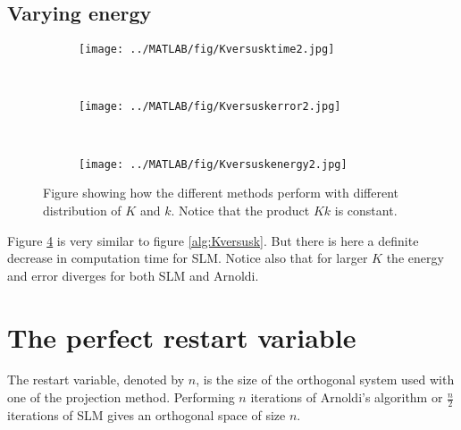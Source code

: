 \subsection{Varying energy}%
\begin{figure}[H]
        \centering
        \begin{subfigure}[b]{0.3\textwidth}
                \texttt{[image: ../MATLAB/fig/Kversusktime2.jpg]}
                \caption{  }
                \label{fig:Kversusktime2}
        \end{subfigure}
        ~
        \begin{subfigure}[b]{0.3\textwidth}
                \texttt{[image: ../MATLAB/fig/Kversuskerror2.jpg]}
                \caption{  }
                \label{fig:Kversuskerror2}
        \end{subfigure}
        ~
        \begin{subfigure}[b]{0.3\textwidth}
                \texttt{[image: ../MATLAB/fig/Kversuskenergy2.jpg]}
                \caption{  }
                \label{fig:Kversuskenergy2}
        \end{subfigure}
        \caption{Figure showing how the different methods perform with different distribution of $K$ and $k$. Notice that the product $Kk$ is constant. }
        \label{fig:Kversusk2}
\end{figure}
Figure \ref{fig:Kversusk2} is very similar to figure \ref{alg:Kversusk}. But there is here a definite decrease in computation time for SLM. Notice also that for larger $K$ the energy and error diverges for both SLM and Arnoldi. 

\section{The perfect restart variable}%
The restart variable, denoted by $n$, is the size of the orthogonal system used with one of the projection method. Performing $n$ iterations of Arnoldi's algorithm or $\frac{n}{2}$ iterations of SLM gives an orthogonal space of size $n$.

